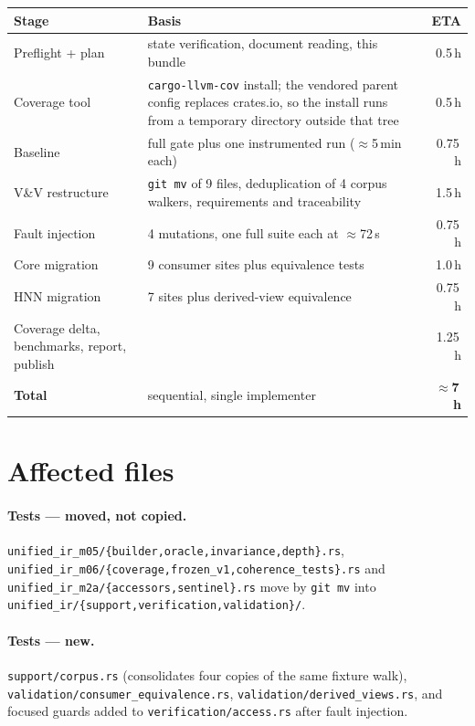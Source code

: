\documentclass[11pt,a4paper]{article}
\newcommand{\code}[1]{\texttt{#1}}
\begin{document}
\begin{longtable}{@{}lp{6.6cm}r@{}}
\toprule
\textbf{Stage} & \textbf{Basis} & \textbf{ETA} \\
\midrule
\endhead
Preflight + plan & state verification, document reading, this bundle & 0.5\,h \\
Coverage tool & \code{cargo-llvm-cov} install; the vendored parent config
  replaces crates.io, so the install runs from a temporary directory outside
  that tree & 0.5\,h \\
Baseline & full gate plus one instrumented run ($\approx$5\,min each) & 0.75\,h \\
V\&V restructure & \code{git mv} of 9 files, deduplication of 4 corpus walkers,
  requirements and traceability & 1.5\,h \\
Fault injection & 4 mutations, one full suite each at $\approx$72\,s & 0.75\,h \\
Core migration & 9 consumer sites plus equivalence tests & 1.0\,h \\
HNN migration & 7 sites plus derived-view equivalence & 0.75\,h \\
Coverage delta, benchmarks, report, publish & & 1.25\,h \\
\midrule
\textbf{Total} & sequential, single implementer & \textbf{$\approx$7\,h} \\
\bottomrule
\end{longtable}

\section{Affected files}

\paragraph{Tests --- moved, not copied.}
\code{unified\_ir\_m05/\{builder,oracle,invariance,depth\}.rs},
\code{unified\_ir\_m06/\{coverage,frozen\_v1,coherence\_tests\}.rs} and
\code{unified\_ir\_m2a/\{accessors,sentinel\}.rs} move by \code{git mv} into
\code{unified\_ir/\{support,verification,validation\}/}.

\paragraph{Tests --- new.} \code{support/corpus.rs} (consolidates four copies of
the same fixture walk), \code{validation/consumer\_equivalence.rs},
\code{validation/derived\_views.rs}, and focused guards added to
\code{verification/access.rs} after fault injection.
\end{document}
